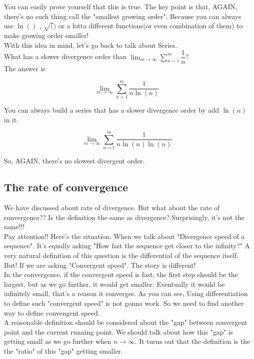 \documentclass{article}
\begin{document}
  You can easily prove yourself that this is true. The key point is that, AGAIN, there's no such thing call the "smallest growing order". Because you can always use $\ln()$ , $\sqrt()$ or a lotta different functions(or even combination of them) to make growing order smaller! \\

  With this idea in mind, let's go back to talk about Series. \\

  What has a slower divergence order than $\displaystyle \lim_{m \to \infty} \sum_{n=1}^{m} \dfrac{1}{n}$?  \\

  The answer is

  \[
	  \displaystyle \lim_{m \to \infty} \sum_{n=1}^{m} \dfrac{1}{n\ln(n)}
  \]

  You can always build a series that has a slower divergence order by add $\ln(n)$ in it.

  \[
	  \displaystyle \lim_{m \to \infty} \sum_{n=1}^{m} \dfrac{1}{n\ln(n)\ln(n)}
  \]

  So, AGAIN, there's no slowest divergent order.

  \subsection{The rate of convergence}

  We have discussed about rate of divergence. But what about the rate of convergence?? Is the definition the same as divergence? Surprisingly, it's not the same!!! \\

  Pay attention!! Here's the situation. When we talk about "Divergence speed of a sequence". It's equally asking "How fast the sequence get closer to the infinity?" A very natural definition of this question is the differential of the sequence itself. But! If we are asking "Convergent speed". The story is different! \\

  In the convergence, if the convergent speed is fast, the first step should be the largest, but as we go further, it would get smaller. Eventually it would be infinitely small, that's a reason it converges. As you can see, Using differentiation to define such "convergent speed" is not gonna work. So we need to find another way to define convengent speed. \\

  A reasonable definition should be considered about the "gap" between convergent point and the current running point. We should talk about how this "gap" is getting small as we go further when $n \to \infty$. It turns out that the definition is the the "ratio" of this "gap" getting smaller.
\end{document}
